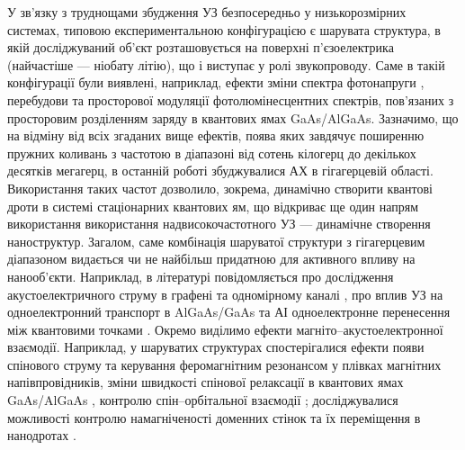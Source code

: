 У зв'язку з труднощами збудження УЗ безпосередньо у низькорозмірних системах, типовою
експериментальною конфігурацією є шарувата структура, в якій досліджуваний об'єкт розташовується на поверхні п'єзоелектрика (найчастіше --- ніобату літію), що і виступає у ролі звукопроводу.
Саме в такій конфігурації були виявлені, наприклад, ефекти зміни спектра фотонапруги \cite{KurylJTF09}, перебудови \cite{Kuryliuk2009} та просторової модуляції \cite{US:PL:GaAs} фотолюмінесцентних спектрів, пов'язаних з просторовим розділенням заряду в квантових ямах  GaAs/AlGaAs.
Зазначимо, що на відміну від всіх згаданих вище ефектів, поява яких завдячує поширенню пружних коливань з частотою в діапазоні від сотень кілогерц до декількох десятків мегагерц,
в останній роботі збуджувалися АХ в гігагерцевій області.
Використання таких частот дозволило, зокрема, динамічно створити квантові дроти в системі стаціонарних квантових ям, що відкриває ще один напрям використання використання надвисокочастотного УЗ --- динамічне створення наноструктур.
Загалом, саме комбінація шаруватої структури з гігагерцевим діапазоном видається чи не найбільш придатною для активного впливу на нанооб'єкти.
Наприклад, в літературі повідомляється про дослідження акустоелектричного струму в графені \cite{US:graphen,US:grafen2,US:grafen3,US:grafen4} та одномірному каналі \cite{US:1D,NETO2016},
про вплив УЗ на одноелектронний транспорт в AlGaAs/GaAs \cite{US:single,US:single2} та
АІ одноелектронне перенесення між квантовими точками \cite{US:Nature}.
Окремо виділимо ефекти магніто--акустоелектронної взаємодії.
 Наприклад, у шаруватих структурах спостерігалися ефекти появи спінового струму \cite{PhysRevLett108:176601} та керування феромагнітним резонансом \cite{PhysRevB90:094401} у плівках магнітних напівпровідників,
зміни  швидкості спінової релаксації в квантових ямах GaAs/AlGaAs \cite{PhysRevB78:153305},
контролю спін--орбітальної взаємодії \cite{Sanada:2011};
досліджувалися можливості контролю намагніченості доменних стінок \cite{LI2014} та їх переміщення в нанодротах \cite{US:nanowire}.



